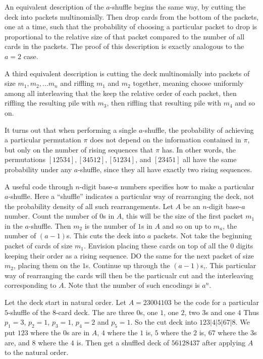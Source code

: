 \documentclass[12pt]{article}
\begin{document}
An equivalent description of the \( a \)-shuffle begins the same way, by
cutting the deck into packets multinomially.  Then drop cards from the
bottom of the packets, one at a time, such that the probability of
choosing a particular packet to drop is proportional to the relative
size of that packet compared to the number of all cards in the packets.
The proof of this description is exactly analogous to the \( a = 2 \)
case.

A third equivalent description is cutting the deck multinomially into
packets of size \( m_1, m_2, \dots m_n \) and riffling \( m_1 \) and \(
m_2 \) together, meaning choose uniformly among all interleaving that
the keep the relative order of each packet, then riffling the resulting
pile with \( m_3 \), then riffling that resulting pile with \( m_4 \)
and so on.

It turns out that when performing a single \( a \)-shuffle, the
probability of achieving a particular permutation \( \pi \) does not
depend on the information contained in \( \pi \), but only on the number
of rising sequences that \( \pi \) has.  In other words, the
permutations \( [12534], [34512], [51234] \), and \( [23451] \) all have
the same probability under any \( a \)-shuffle, since they all have
exactly two rising sequences.

A useful code through \( n \)-digit base-\( a \) numbers specifies how
to make a particular \( a \)-shuffle.  Here a ``shuffle'' indicates a
particular way of rearranging the deck, not the probability density of
all such rearrangements.  Let \( A \) be an \( n \)-digit base-\( a \)
number. Count the number of \( 0 \)s in \( A \), this will be the size
of the first packet \( m_1 \) in the \( a \)-shuffle.  Then \( m_2 \) is
the number of \( 1 \)s in \( A \) and so on up to \( m_a \), the number
of \( (a-1) \)s.  This cuts the deck into \( a \) packets.  Not take the
beginning packet of cards of size \( m_1 \).  Envision placing these
cards on top of all the \( 0 \) digits keeping their order as a rising
sequence.  DO the same for the next packet of size \( m_2 \), placing
them on the \( 1 \)s.  Continue up through the \( (a-1) \)s,.  This
particular way of rearranging the cards will then be the particualr cut
and the interleaving corresponding to \( A \).  Note that the number of
such encodings is \( a^n \).

\begin{example}
    Let the deck start in natural order.  Let \( A = 23004103 \) be the
    code for a particular \( 5 \)-shuffle of the \( 8 \)-card deck.  The
    are three \( 0 \)s, one \( 1 \), one \( 2 \), two \( 3 \)s and one \(
    4 \) Thus \( p_1 = 3 \), \( p_2 = 1 \), \( p_3 =1 \), \( p_4 = 2 \)
    and \( p_5 = 1 \).  So the cut deck into \( 123|4|5|67|8 \).  We put
    \( 123 \) where the \( 0 \)s are in \( A \), \( 4 \) where the \( 1 \)
    is, \( 5 \) where the \( 2 \) is, \( 67 \) where the \( 3 \)s are,
    and \( 8 \) where the \( 4 \) is.  Then get a shuffled deck of \(
    56128437 \) after applying \( A \) to the natural order.
\end{example}
\end{document}
